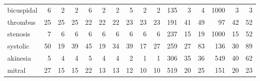 \begin{table}[h!]
{\begin{tabular}{l|rrrrrrrrrrrrrrr}
			bicuspidal             & 6                         & 2                         & 2                         & 6                         & 2                         & 2                         & 5                         & 2                         & 2                         & 135                       & 3                         & 4                         & 1000                      & 3                         & 3                         \\  
			thrombus               & 25                        & 25                        & 25                        & 22                        & 22                        & 22                        & 23                        & 23                        & 23                        & 191                       & 41                        & 49                        & 97                        & 42                        & 52                        \\    
			stenosis               & 7                         & 6                         & 6                         & 6                         & 6                         & 6                         & 6                         & 6                         & 6                         & 237                       & 15                        & 19                        & 1000                      & 15                        & 52                        \\    
			systolic               & 50                        & 19                        & 39                        & 45                        & 19                        & 34                        & 39                        & 17                        & 27                        & 259                       & 27                        & 83                        & 136                       & 30                        & 89                        \\     
			akinesia               & 5                         & 4                         & 4                         & 5                         & 4                         & 4                         & 2                         & 1                         & 1                         & 306                       & 35                        & 36                        & 549                       & 40                        & 62                        \\     
			mitral                 & 27                        & 15                        & 15                        & 22                        & 13                        & 13                        & 12                        & 10                        & 10                        & 519                       & 20                        & 25                        & 151                       & 20                        & 23                        \\     

\end{tabular}}
\end{table}
